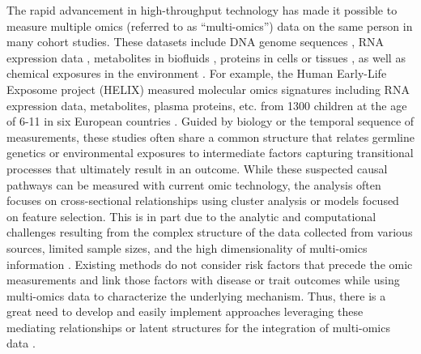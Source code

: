 The rapid advancement in high-throughput technology has made it possible to measure multiple omics (referred to as ``multi-omics'') data on the same person in many cohort studies. These datasets include DNA genome sequences \citep{goodwin2016coming}, RNA expression data \citep{ozsolak2011rna}, metabolites in biofluids \citep{beger2013review}, proteins in cells or tissues \citep{aslam2017proteomics}, as well as chemical exposures in the environment \citep{wild2005complementing}. For example, the Human Early-Life Exposome project (HELIX) measured molecular omics signatures including RNA expression data, metabolites, plasma proteins, etc. from 1300 children at the age of 6-11 in six European countries \citep{vrijheid2014human}. Guided by biology or the temporal sequence of measurements, these studies often share a common structure that relates germline genetics or environmental exposures to intermediate factors capturing transitional processes that ultimately result in an outcome. While these suspected causal pathways can be measured with current omic technology, the analysis often focuses on cross-sectional relationships using cluster analysis or models focused on feature selection. This is in part due to the analytic and computational challenges resulting from the complex structure of the data collected from various sources, limited sample sizes, and the high dimensionality of multi-omics information \citep{tini2019multi}. Existing methods do not consider risk factors that precede the omic measurements and link those factors with disease or trait outcomes while using multi-omics data to characterize the underlying mechanism. Thus, there is a great need to develop and easily implement approaches leveraging these mediating relationships or latent structures for the integration of multi-omics data \citep{subramanian2020multi}. 

